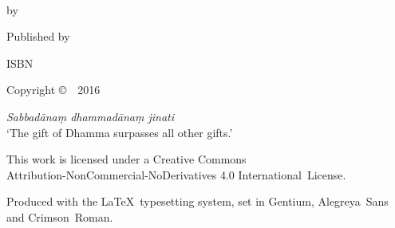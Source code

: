 \cleartoverso
\thispagestyle{empty}

{\copyrightsize
\centering
\setlength{\parindent}{0pt}%
\setlength{\parskip}{0.8\baselineskip}%

\thetitle\\
by \theauthor

Published by \thePublisher

ISBN \theISBN

Copyright \copyright\ \thePublisher\ 2016

\vfill

{\footnotesize

\textit{Sabbadānaṃ dhammadānaṃ jinati}\\
‘The gift of Dhamma surpasses all other gifts.’

This work is licensed under a Creative Commons\\
Attribution-NonCommercial-NoDerivatives 4.0 International~License.

Produced with the \LaTeX\ typesetting system, set in Gentium, Alegreya~Sans and Crimson~Roman.

\theEditionInfo

}}

%
%
%
%
%
%
%
%
%
%
%
%
%
%
